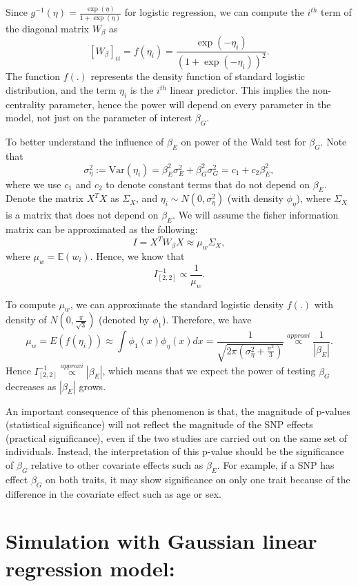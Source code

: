 \documentclass[
]{article}
\begin{document}
Since \(g^{-1}(\eta)= \frac{\exp(\eta)}{1+\exp(\eta)}\) for logistic
regression, we can compute the \(i^{th}\) term of the diagonal matrix
\(W_\beta\) as
\[[W_\beta]_{ii} = f(\eta_i)=\frac{\exp(-\eta_i)}{(1+\exp(-\eta_i))^2}.\]
The function \(f(.)\) represents the density function of standard
logistic distribution, and the term \(\eta_i\) is the \(i^{th}\) linear
predictor. This implies the non-centrality parameter, hence the power
will depend on every parameter in the model, not just on the parameter
of interest \(\beta_G\).

To better understand the influence of \(\beta_E\) on power of the Wald
test for \(\beta_G\). Note that
\[\sigma_\eta^2:=\text{Var}(\eta_i) = \beta_E^2\sigma_E^2+\beta_G^2\sigma_G^2 = c_1 +c_2\beta_E^2,\]
where we use \(c_1\) and \(c_2\) to denote constant terms that do not
depend on \(\beta_E\). Denote the matrix \(X^TX\) as \(\Sigma_X\), and
\(\eta_i\sim N(0,\sigma_\eta^2)\) (with density \(\phi_\eta\)), where
\(\Sigma_X\) is a matrix that does not depend on \(\beta_E\). We will
assume the fisher information matrix can be approximated as the
following:\[I = X^TW_\beta X \approx \mu_w \Sigma_X,\] where
\(\mu_w = \mathbb{E}(w_i)\). Hence, we know that
\[I^{-1}_{[2,2]} \propto \frac{1}{\mu_w}.\]

To compute \(\mu_w\), we can approximate the standard logistic density
\(f(.)\) with density of \(N(0,\frac{\pi}{\sqrt{3}})\) (denoted by
\(\phi_1\)). Therefore, we have
\[\mu_w = E(f(\eta_i)) \approx \int\phi_1(x)\phi_{\eta}(x)dx = \frac{1}{\sqrt{2\pi(\sigma_\eta^2+\frac{\pi^2}{3})}} \overset{approxi}{\propto} \frac{1}{|\beta_E|}.\]
Hence \(I^{-1}_{[2,2]} \overset{approxi}{\propto} |\beta_E|\), which
means that we expect the power of testing \(\beta_G\) decreases as
\(|\beta_E|\) grows.

An important consequence of this phenomenon is that, the magnitude of
p-values (statistical significance) will not reflect the magnitude of
the SNP effects (practical significance), even if the two studies are
carried out on the same set of individuals. Instead, the interpretation
of this p-value should be the significance of \(\beta_G\) relative to
other covariate effects such as \(\beta_E\). For example, if a SNP has
effect \(\beta_G\) on both traits, it may show significance on only one
trait because of the difference in the covariate effect such as age or
sex.

\hypertarget{simulation-with-gaussian-linear-regression-model}{%
\section{Simulation with Gaussian linear regression
model:}\label{simulation-with-gaussian-linear-regression-model}}
\end{document}
